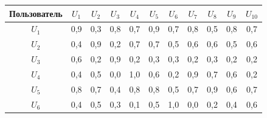 \begin{table}\small %


\begin{center}









        \vspace*{2ex}


        


        \tabcolsep=6.5pt


        


        \begin{tabular}{|c|c|c|c|c|c|c|c|c|c|c|}


        \hline


           Пользователь  &$U_1$&$U_2$&$U_3$&$U_4$&$U_5$&$U_6$&$U_7$&$U_8$&$U_9$&$U_{10}$\\


        \hline              


         $U_1$&\cellcolor[gray]{.6}0,9&0,3&0,8&0,7&0,9&0,7&0,8&0,5&0,8&0,7\\




         $U_2$&0,4&\cellcolor[gray]{.6}0,9&0,2&0,7&0,7&0,5&0,6&0,6&0,5&0,6\\




         $U_3$&0,6&0,2&\cellcolor[gray]{.6}0,9&0,2&0,3&0,3&0,2&0,3&0,2&0,2\\




         $U_4$&0,4&0,5&0,0&\cellcolor[gray]{.6}1,0&0,6&0,2&0,9&0,7&0,6&0,2\\        




         $U_5$&0,8&0,7&0,4&0,8&\cellcolor[gray]{.6}0,8&0,5&0,7&0,9&0,6&0,7\\




         $U_6$&0,4&0,5&0,3&0,1&0,5&\cellcolor[gray]{.6}1,0&0,0&0,2&0,4&0,6\\        





\end{tabular}
\end{center}
\end{table}
